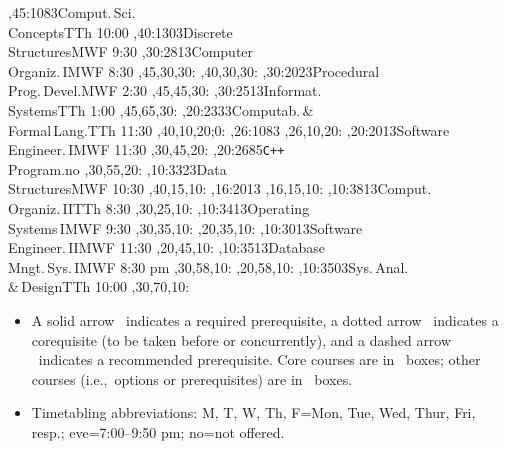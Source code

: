 \documentclass{article}
\begin{document}
\thispagestyle{empty}
\begin{preview}
\setcounter{diagheight}{50}
\begin{chart}
,45:{1083}{Comput.\,Sci.\\Concepts}{TTh 10:00}
,40:{1303}{Discrete\\Structures}{MWF 9:30}
,30:{2813}{Computer\\Organiz.\,I}{MWF 8:30}
  ,45,30,30:
  ,40,30,30:
,30:{2023}{Procedural\\Prog.\,Devel.}{MWF 2:30}
  ,45,45,30:
,30:{2513}{Informat.\\Systems}{TTh 1:00}
  ,45,65,30:
,20:{2333}{Computab.\,\&\\Formal\,Lang.}{TTh 11:30}
  ,40,10,20;0:
  ,26:{1083}
  ,26,10,20:
,20:{2013}{Software\\Engineer.\,I}{MWF 11:30}
  ,30,45,20:
,20:{2685}{\texttt{C++}\\Program.}{no}
  ,30,55,20:
,10:{3323}{Data\\Structures}{MWF 10:30}
  ,40,15,10:
  ,16:{2013}
  ,16,15,10:
,10:{3813}{Comput.\\Organiz.\,II}{TTh 8:30}
  ,30,25,10:
,10:{3413}{Operating\\Systems\,I}{MWF 9:30}
  ,30,35,10:
  ,20,35,10:
,10:{3013}{Software\\Engineer.\,II}{MWF 11:30}
  ,20,45,10:
,10:{3513}{Database\\Mngt.\,Sys.\,I}{MWF 8:30 pm}
  ,30,58,10:
  ,20,58,10:
,10:{3503}{Sys.\,Anal.\\\&\,Design}{TTh 10:00}
  ,30,70,10:
\end{chart}
\begin{center}
\begin{minipage}{6.0in}
\begin{itemize}
\item
A solid arrow \solidarrow\  indicates a required prerequisite,
a dotted arrow \dottedarrow\
indicates a corequisite (to be taken before or concurrently), and a
dashed arrow \dashedarrow\ indicates a recommended prerequisite.
Core courses are in \boldbox\ boxes;
other courses (i.e.,~options or prerequisites)
are in \lightbox\ boxes.
\item Timetabling abbreviations: M, T, W, Th, F=Mon, Tue, Wed, Thur, Fri,
resp.; eve=7:00--9:50 pm; no=not offered.
\end{itemize}
\end{minipage}
\end{center}
\end{preview}
\end{document}
